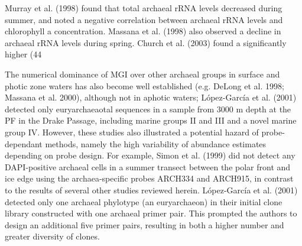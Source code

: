 Murray et al. (1998) found that total archaeal rRNA levels decreased during summer, and noted a negative correlation between archaeal rRNA levels and chlorophyll a concentration. Massana et al. (1998) also observed a decline in archaeal rRNA levels during spring. Church et al. (2003) found a significantly higher (44%

The numerical dominance of MGI over other archaeal groups in surface and photic zone waters has also become well established (e.g. DeLong et al. 1998; Massana et al. 2000), although not in aphotic waters; López-García et al. (2001) detected only euryarchaeaotal sequences in a sample from 3000 m depth at the PF in the Drake Passage, including marine groups II and III and a novel marine group IV. However, these studies also illustrated a potential hazard of probe-dependant methods, namely the high variability of abundance estimates depending on probe design. For example, Simon et al. (1999) did not detect any DAPI-positive archaeal cells in a summer transect between the polar front and ice edge using the archaea-specific probes ARCH334 and ARCH915, in contrast to the results of several other studies reviewed herein. López-García et al. (2001) detected only one archaeal phylotype (an euryarchaeon) in their initial clone library constructed with one archaeal primer pair. This prompted the authors to design an additional five primer pairs, resulting in both a higher number and greater diversity of clones.

